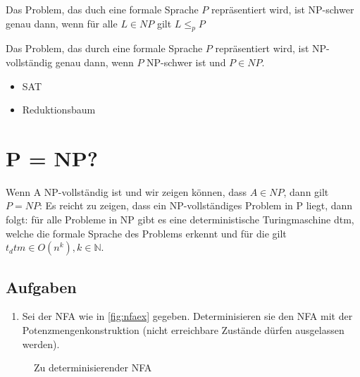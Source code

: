 Das Problem, das duch eine formale Sprache $P$ repräsentiert wird, ist NP-schwer
genau dann, wenn für alle $L \in NP$ gilt $L \leq_p P$

Das Problem, das durch eine formale Sprache $P$ repräsentiert wird, ist NP-vollständig
genau dann, wenn $P$ NP-schwer ist und $P \in NP$.

\begin{itemize}
    \item SAT
    \item Reduktionsbaum
\end{itemize}

\section{P = NP?}

Wenn A NP-vollständig ist und wir zeigen können, dass $A \in NP$, dann gilt $P = NP$:
Es reicht zu zeigen, dass ein NP-vollständiges Problem in P liegt,
dann folgt: für alle Probleme in NP gibt es eine deterministische Turingmaschine dtm,
welche die formale Sprache des Problems erkennt und für die gilt $t_dtm \in O(n^k), k \in \mathbb{N}$.


\subsection*{Aufgaben}
\begin{enumerate}
    \item Sei der NFA wie in \autoref{fig:nfaex} gegeben.
        Determinisieren sie den NFA mit der Potenzmengenkonstruktion (nicht erreichbare Zustände dürfen ausgelassen werden).
\end{enumerate}

\begin{figure}[ht] %
\centering %
\caption{Zu determinisierender NFA}\label{fig:nfaex}
\end{figure}
